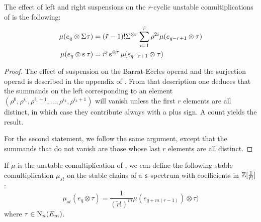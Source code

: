 \begin{proposition}\label{prop:suspensionunstable}
    The effect of left and right suspensions on the $r$-cyclic unstable comultiplications of \cite{medina2021may_st} is the following:
    \begin{align*}
        \mu(e_q\otimes \susp{} \tau) &= (\tilde{r}-1)!\susp{\otimes r}\sum_{i=1}^{\tilde{r}} \rho^{2i}\mu(e_{q-r+1}\otimes \tau)
        \\
       \mu(e_q\otimes \sus{}\tau) &= \tilde{r}!\sus{\otimes r}\mu(e_{q-r+1}\otimes \tau)
    \end{align*}
\end{proposition}

\begin{proof}
    The effect of suspension on the Barrat-Eccles operad and the surjection operad is described in the appendix of \cite{berger2004combinatorial}. From that description one deduces that the summands on the left corresponding to an element $(\rho^0,\rho^{i_1},\rho^{i_1+1},\ldots,\rho^{i_k},\rho^{i_k+1})$ will vanish unless the first $r$ elements are all distinct, in which case they contribute always with a plus sign. A count yields the result.

    For the second statement, we follow the same argument, except that the summands that do not vanish are those whose last $r$ elements are all distinct.
\end{proof}

\begin{corollary}
    If $\mu$ is the unstable comultiplication of \cite{medina2021may_st}, we can define the following stable comultiplication $\mu_{st}$ on the stable chains of a $\sus{}$-spectrum with coefficients in $\bZ[\frac{1}{\tilde{r}!}]$:
    \[
        \mu_{st}(e_q\otimes \tau) = \frac{1}{(\tilde{r}!)^{m}}\mu(e_{q+m(r-1)})\otimes \tau)
    \]
    where $\tau\in \chains[n](E_m)$.
\end{corollary}

